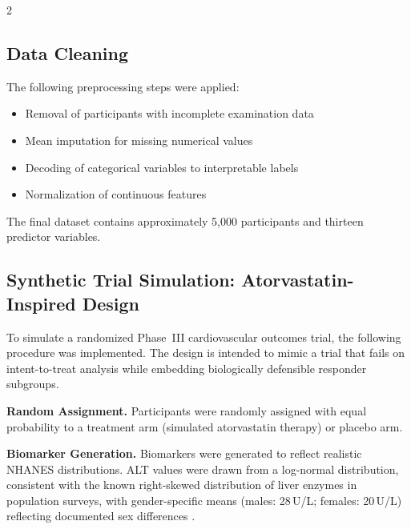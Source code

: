 \documentclass[12pt]{article}
\begin{document}
\begin{multicols}{2}
\subsection{Data Cleaning}

The following preprocessing steps were applied:
\begin{itemize}
\item Removal of participants with incomplete examination data
\item Mean imputation for missing numerical values
\item Decoding of categorical variables to interpretable labels
\item Normalization of continuous features
\end{itemize}
The final dataset contains approximately 5,000 participants and thirteen
predictor variables.

\subsection{Synthetic Trial Simulation: Atorvastatin-Inspired Design}

To simulate a randomized Phase~III cardiovascular outcomes trial, the
following procedure was implemented.  The design is intended to mimic a trial
that fails on intent-to-treat analysis while embedding biologically defensible
responder subgroups.

\textbf{Random Assignment.}
Participants were randomly assigned with equal probability to a treatment arm
(simulated atorvastatin therapy) or placebo arm.

\textbf{Biomarker Generation.}
Biomarkers were generated to reflect realistic NHANES distributions.  ALT
values were drawn from a log-normal distribution, consistent with the known
right-skewed distribution of liver enzymes in population surveys, with
gender-specific means (males: 28\,U/L; females: 20\,U/L) reflecting
documented sex differences \citep{prati2002updated}.


\end{multicols}
\end{document}
